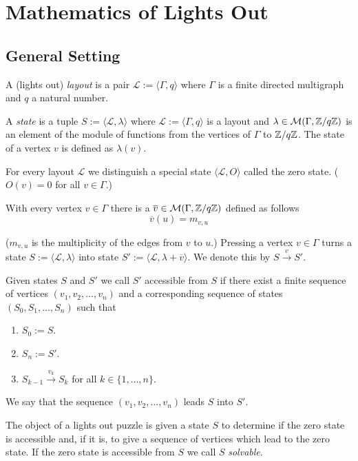 \chapter{Mathematics of Lights Out}\label{chapter:mathematics}

\section{General Setting}

\begin{definition}
	A (lights out) \emph{layout} is a pair $\mathcal{L} :=
	\langle\Gamma,q\rangle$ where $\Gamma$ is a finite directed multigraph
	and $q$ a natural number. 
	
	A \emph{state} is a tuple $S :=
	\langle\mathcal{L},\lambda\rangle$ where $\mathcal{L} :=
	\langle\Gamma,q\rangle$ is a layout and $\lambda \in
	\mathcal{M}(\Gamma,\mathbb{Z}/q\mathbb{Z})$ is an element of the module of functions
	from the vertices of $\Gamma$ to $\mathbb{Z}/q\mathbb{Z}$. The state of a vertex $v$ is 
	defined as $\lambda(v)$.
	
	For every layout $\mathcal{L}$ we distinguish a special state
	$\langle\mathcal{L},O\rangle$ called the zero state. ($O(v) = 0$ for all
	$v\in\Gamma$.) 
	
	With every vertex $v\in\Gamma$ there is a $\overline{v} \in
	\mathcal{M}(\Gamma,\mathbb{Z}/q\mathbb{Z})$ defined as follows
	\[
		\overline{v}(u) = m_{v,u}
	\]
	
	($m_{v,u}$ is the multiplicity of the edges from $v$ to $u$.)
	Pressing a vertex $v\in\Gamma$ turns a state $S :=
	\langle\mathcal{L},\lambda\rangle$ into state
	$S':=\langle\mathcal{L},\lambda+\overline{v}\rangle$. We denote this 
	by $S \overset{v}{\rightarrow} S'$.
	
	Given states $S$ and $S'$ we call $S'$ accessible from
	$S$ if there exist a finite sequence of vertices
	$(v_{1},v_{2},\ldots,v_{n})$ and a corresponding sequence of
	states $(S_{0},S_{1},\ldots,S_{n})$ such that 
	\begin{enumerate}
		\item $S_{0} := S$.
		
		\item $S_{n} := S'$.

		\item $S_{k-1} \overset{v_{k}}{\rightarrow}
		S_{k}$ for all $k\in\{1,\ldots,n\}$.
	\end{enumerate}
	We say that the sequence $(v_{1},v_{2},\ldots,v_{n})$ leads $S$
	into $S'$.
	
	The object of a lights out puzzle is given a state $S$ to determine if
	the zero state is accessible and, if it is, to give a sequence of
	vertices which lead to the zero state. If the zero state is accessible from $S$ we call
	$S$ \emph{solvable}. 
\end{definition}

